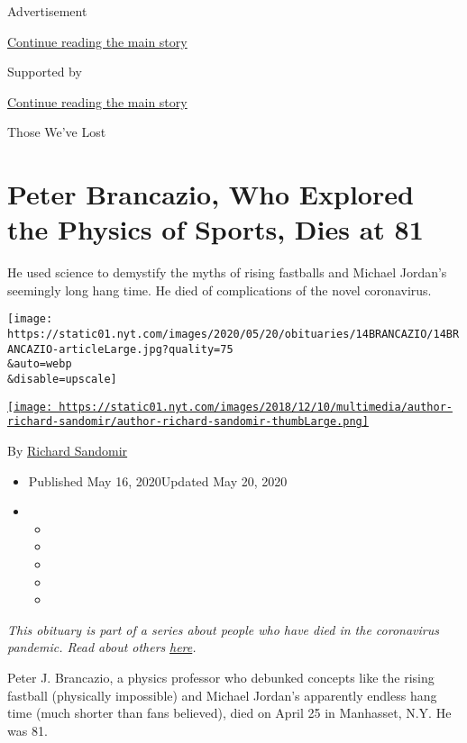 Advertisement

\protect\hyperlink{after-top}{Continue reading the main story}

Supported by

\protect\hyperlink{after-sponsor}{Continue reading the main story}

Those We've Lost

\hypertarget{peter-brancazio-who-explored-the-physics-of-sports-dies-at-81}{%
\section{Peter Brancazio, Who Explored the Physics of Sports, Dies at
81}\label{peter-brancazio-who-explored-the-physics-of-sports-dies-at-81}}

He used science to demystify the myths of rising fastballs and Michael
Jordan's seemingly long hang time. He died of complications of the novel
coronavirus.

\texttt{[image: https://static01.nyt.com/images/2020/05/20/obituaries/14BRANCAZIO/14BRANCAZIO-articleLarge.jpg?quality=75\\\&auto=webp\\\&disable=upscale]}

\href{https://www.nytimes.com/by/richard-sandomir}{\texttt{[image: https://static01.nyt.com/images/2018/12/10/multimedia/author-richard-sandomir/author-richard-sandomir-thumbLarge.png]}}

By \href{https://www.nytimes.com/by/richard-sandomir}{Richard Sandomir}

\begin{itemize}
\item
  Published May 16, 2020Updated May 20, 2020
\item
  \begin{itemize}
  \item
  \item
  \item
  \item
  \item
  \end{itemize}
\end{itemize}

\emph{This obituary is part of a series about people who have died in
the coronavirus pandemic. Read about others}
\href{https://www.nytimes.com/series/people-who-have-died-of-the-coronavirus}{\emph{here}}\emph{.}

Peter J. Brancazio, a physics professor who debunked concepts like the
rising fastball (physically impossible) and Michael Jordan's apparently
endless hang time (much shorter than fans believed), died on April 25 in
Manhasset, N.Y. He was 81.

